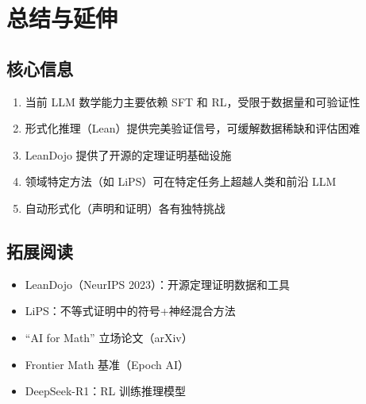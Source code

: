 \section{总结与延伸}

\subsection{核心信息}

\begin{enumerate}
    \item 当前 LLM 数学能力主要依赖 SFT 和 RL，受限于数据量和可验证性
    \item 形式化推理（Lean）提供完美验证信号，可缓解数据稀缺和评估困难
    \item LeanDojo 提供了开源的定理证明基础设施
    \item 领域特定方法（如 LiPS）可在特定任务上超越人类和前沿 LLM
    \item 自动形式化（声明和证明）各有独特挑战
\end{enumerate}

\subsection{拓展阅读}
\begin{itemize}
    \item LeanDojo（NeurIPS 2023）：开源定理证明数据和工具
    \item LiPS：不等式证明中的符号+神经混合方法
    \item ``AI for Math'' 立场论文（arXiv）
    \item Frontier Math 基准（Epoch AI）
    \item DeepSeek-R1：RL 训练推理模型
\end{itemize}



